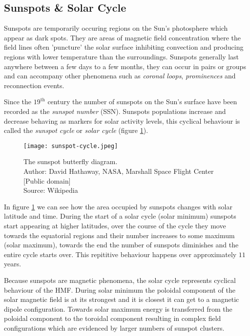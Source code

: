 \subsection{Sunspots \& Solar Cycle}\label{sec:sunspots}

Sunspots are temporarily occuring regions on the Sun's photosphere which appear as dark spots. They are areas 
of magnetic field concentration where the field lines often 'puncture' the solar surface inhibiting convection 
and producing regions with lower temperature than the surroundings. Sunspots generally last anywhere between a 
few days to a few months, they can occur in pairs or groups and can accompany other phenomena such as 
\emph{coronal loops}, \emph{prominences} and reconnection events.

Since the $19^{\text{th}}$ century the number of sunspots on the Sun's surface have been recorded as the 
\emph{sunspot number} (SSN). Sunspots populations increase and decrease behaving as markers for solar activity levels, 
this cyclical behaviour is called the \emph{sunspot cycle} or \emph{solar cycle} (figure \ref{fig:SolarCycle}). 

\begin{figure}
    \noindent\texttt{[image: sunspot-cycle.jpeg]}
    \caption{\small The sunspot butterfly diagram.  \\ 
    Author: David Hathaway, NASA, Marshall Space Flight Center [Public domain] \\ 
    Source: Wikipedia}
    \label{fig:SolarCycle}
\end{figure}

In figure \ref{fig:SolarCycle} we can see how the area occupied by sunspots changes with solar latitude and time. 
During the start of a solar cycle (solar minimum) sunspots start appearing at higher latitudes, over the course 
of the cycle they move towards the equatorial regions and their number increases to some maximum (solar maximum), 
towards the end the number of sunspots diminishes and the entire cycle starts over. This repititive behaviour 
happens over approximately $11$ years.

Because sunspots are magnetic phenomena, the solar cycle represents cyclical behaviour of the HMF. During solar 
minimum the poloidal component of the solar magnetic field is at its strongest and it is closest it can get to 
a magnetic dipole configuration. Towards solar maximum energy is transferred from the poloidal component to the 
toroidal component resulting in complex field configurations which are evidenced by larger numbers of sunspot 
clusters.

